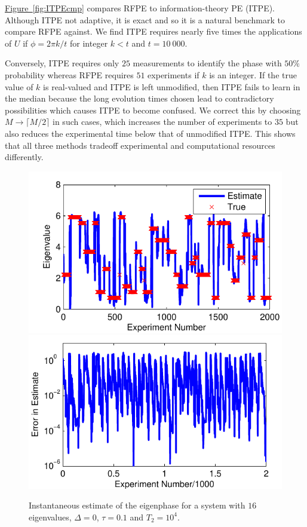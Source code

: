 \documentclass[aps,pra,amsmath,twocolumn,amssymb,superscriptaddress]{revtex4-1}
\newcommand{\fig}[1]{\hyperref[fig:#1]{Figure~\ref*{fig:#1}}}
\begin{document}
\fig{ITPEcmp} compares RFPE to information-theory PE (ITPE).  Although ITPE not adaptive, it is exact and so it is a natural benchmark to compare RFPE against.  We find  ITPE requires nearly five times the applications of $U$ if $\phi=2\pi k/t$ for integer $k<t$ and $t=10~000$.  

Conversely,
ITPE requires only $25$ measurements to identify the phase with $50\%$
probability whereas RFPE requires $51$ experiments if $k$ is an integer.  If
the true value of $k$ is real-valued and ITPE is left unmodified, then  ITPE
fails to learn in the median because the long evolution times chosen lead to
contradictory possibilities which causes ITPE to become confused.  We correct
this by choosing $M\rightarrow \lceil M/2\rceil$ in such cases, which increases the number
of experiments to $35$ but also reduces the experimental time below that of
unmodified ITPE.  This shows that all three methods
tradeoff experimental and computational resources differently.

\begin{figure}
    \begin{centering}
        \includegraphics[width=0.4\linewidth]{Errtrack1.pdf}
        \hspace{5mm}
        \includegraphics[width=0.4\linewidth]{Errtrack2.pdf}
    \end{centering}
    \caption{\label{fig:Errplot}
        Instantaneous estimate of the eigenphase  for a system with $16$ eigenvalues, $\Delta=0$, $\tau=0.1$ and $T_2=10^4$.
    }
\end{figure}
\end{document}
